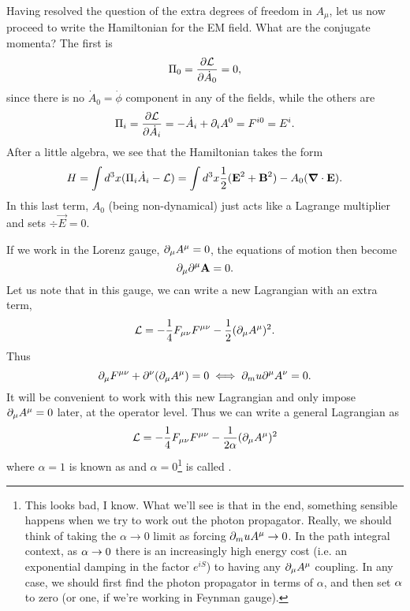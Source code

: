 Having resolved the question of the extra degrees of freedom in $A_\mu$, let us now proceed to write the Hamiltonian for the EM field. What are the conjugate momenta? The first is
$$\Pi_0=\frac{\partial \mathcal L}{\partial \dot A_0}=0,$$
since there is no $\dot A_0=\dot \phi$ component in any of the fields, while the others are
$$\Pi_i=\frac{\partial \mathcal L}{\partial \dot A_i}=-\dot A_i+\partial_i A^0=F^{i0}=E^i.$$
After a little algebra, we see that the Hamiltonian takes the form
$$H=\int d^3x (\Pi_i \dot A_i -\mathcal L)=\int d^3x \frac{1}{2}(\boldsymbol{\mathbf{E}}^2 +\boldsymbol{\mathbf{B}}^2)-A_0(\mbox{\boldmath$ \nabla $} \cdot \boldsymbol{\mathbf{E}}).$$
In this last term, $A_0$ (being non-dynamical) just acts like a Lagrange multiplier and sets $\div \vec E=0$.

If we work in the Lorenz gauge, $\partial_\mu A^\mu=0$, the equations of motion then become
$$\partial_\mu \partial^\mu \boldsymbol{\mathbf{A}}=0.$$ Let us note that in this gauge, we can write a new Lagrangian with an extra term,
$$\mathcal L=-\frac{1}{4}F_{\mu\nu}F^{\mu\nu}-\frac{1}{2}(\partial_\mu A^\mu)^2.$$
Thus
$$\partial_\mu F^{\mu\nu}+\partial^\nu(\partial_\mu A^\mu)= 0 \iff \partial_mu \partial^\mu A^\nu =0.$$
It will be convenient to work with this new Lagrangian and only impose $\partial_\mu A^\mu=0$ later, at the operator level. Thus we can write a general Lagrangian as
$$\mathcal L=-\frac{1}{4}F_{\mu\nu}F^{\mu\nu}-\frac{1}{2\alpha}(\partial_\mu A^\mu)^2$$
where $\alpha=1$ is known as  and $\alpha=0$\footnote{This looks bad, I know. What we'll see is that in the end, something sensible happens when we try to work out the photon propagator. Really, we should think of taking the $\alpha\to 0$ limit as forcing $\partial_mu A^\mu\to 0$. In the path integral context, as $\alpha\to 0$ there is an increasingly high energy cost (i.e. an exponential damping in the factor $e^{iS}$) to having any $\partial_\mu A^\mu$ coupling. In any case, we should first find the photon propagator in terms of $\alpha$, and then set $\alpha$ to zero (or one, if we're working in Feynman gauge).} is called .